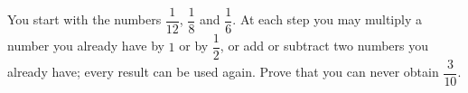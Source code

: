 You start with the numbers $\dfrac{1}{12}$, $\dfrac{1}{8}$ and $\dfrac{1}{6}$. At each step you may multiply a number you already have by $1$ or by $\dfrac{1}{2}$, or add or subtract two numbers you already have; every result can be used again. Prove that you can never obtain $\dfrac{3}{10}$.
